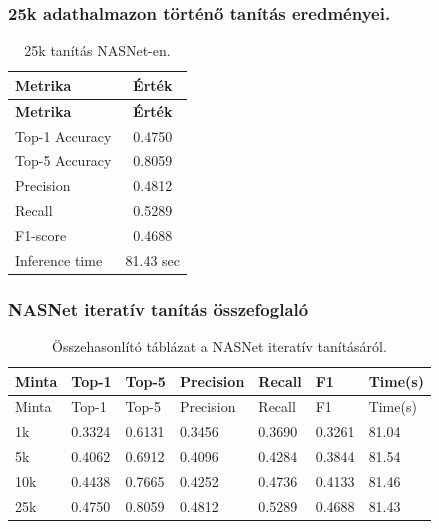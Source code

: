       \subsubsection{25k adathalmazon történő tanítás eredményei.}
        \begin{center}
          \begin{longtable}{l c}
          \caption{25k tanítás NASNet-en.} \label{tab:phase03_NASNet_25k} \\
          \toprule
          \textbf{Metrika} & \textbf{Érték} \\
          \midrule
          \endfirsthead
          \toprule
          \textbf{Metrika} & \textbf{Érték} \\
          \midrule
          \endhead
          Top-1 Accuracy & 0.4750 \\
          Top-5 Accuracy & 0.8059 \\
          Precision      & 0.4812 \\
          Recall         & 0.5289 \\
          F1-score       & 0.4688 \\
          Inference time & 81.43 sec \\
          \bottomrule
          \end{longtable}
        \end{center}

        \subsubsection{NASNet iteratív tanítás összefoglaló}
        \begin{center}
          \begin{longtable}{lllllll}
          \caption{Összehasonlító táblázat a NASNet iteratív tanításáról.}\label{tab:phase3_NASNet_summary_table}\\
          \toprule
          Minta & Top-1 & Top-5 & Precision & Recall & F1 & Time(s) \\
          \midrule
          \endfirsthead
          \toprule
          Minta & Top-1 & Top-5 & Precision & Recall & F1 & Time(s) \\
          \midrule
          \endhead
          1k & 0.3324 & 0.6131 & 0.3456 & 0.3690 & 0.3261 & 81.04 \\
          5k & 0.4062 & 0.6912 & 0.4096 & 0.4284 & 0.3844 & 81.54 \\
          10k & 0.4438 & 0.7665 & 0.4252 & 0.4736 & 0.4133 & 81.46 \\
          25k & 0.4750 & 0.8059 & 0.4812 & 0.5289 & 0.4688 & 81.43 \\
          \bottomrule
          \end{longtable}
        \end{center}
        
